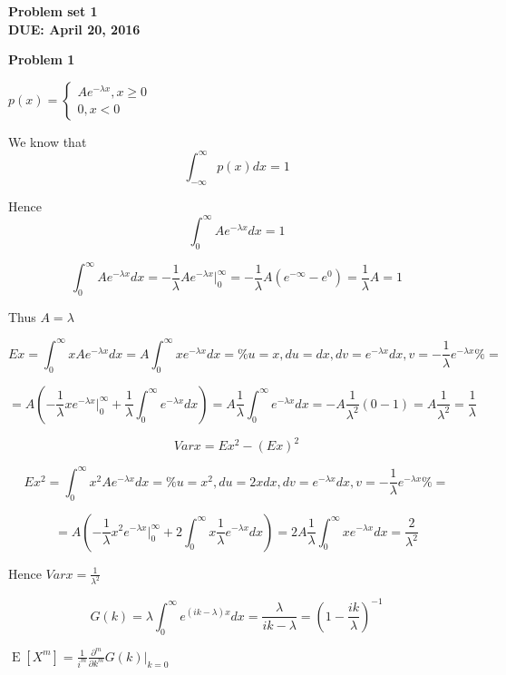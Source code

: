 \documentclass[12pt]{article}
\begin{document}
	\begin{center}
		\textbf{Problem set 1 \\
			DUE: April 20, 2016 \\}
	\end{center}
		
	\bigskip
	
	\textbf{Problem 1}		
	
	\bigskip
		
	$	p(x) = \begin{cases}
		A e^{-\lambda x}, x \geq 0\\
		0, x < 0
	\end{cases}
	$ 
	
	We know that $$ \int_{-\infty}^{\infty} p(x) dx = 1 $$
	
	Hence $$ \int_{0}^{\infty} A e^{-\lambda x} dx = 1 $$
	
	$$ \int_{0}^{\infty} A e^{-\lambda x} dx = -\frac{1}{\lambda} A e^{-\lambda x} |_{0}^{\infty} = -\frac{1}{\lambda} A (e^{-\infty} - e^0) = \frac{1}{\lambda} A = 1 $$
	
	Thus $A = \lambda$ 
	
	$$ Ex = \int_{0}^{\infty} x A e^{-\lambda x} dx = A \int_{0}^{\infty} x e^{-\lambda x} dx = \% u = x, du = dx, dv = e^{-\lambda x}dx, v = -\frac{1}{\lambda} e^{-\lambda x} \% = $$
	
	$$ = A \left( -\frac{1}{\lambda} xe^{-\lambda x} |_{0}^{\infty} + \frac{1}{\lambda} \int_{0}^{\infty} e^{-\lambda x} dx \right) = A \frac{1}{\lambda} \int_{0}^{\infty} e^{-\lambda x} dx = - A \frac{1}{\lambda^2}(0 - 1) = A \frac{1}{\lambda^2} = \frac{1}{\lambda} $$
	
	$$ Var x = Ex^2 - (Ex)^2 $$
	
	$$ Ex^2 = \int_{0}^{\infty} x^2 A e^{-\lambda x} dx = \% u = x^2, du = 2xdx, dv = e^{-\lambda x}dx, v = -\frac{1}{\lambda} e^{-\lambda x} \% = $$
	
	$$ = A \left( - \frac{1}{\lambda} x^2 e^{-\lambda x} |_{0}^{\infty} + 2 \int_{0}^{\infty} x \frac{1}{\lambda} e^{-\lambda x} dx \right) = 2A\frac{1}{\lambda} \int_{0}^{\infty} x e^{-\lambda x} dx = \frac{2}{\lambda^2} $$
	
	Hence $Varx = \frac{1}{\lambda^2}$
	
	$$ G(k) = \lambda \int_{0}^{\infty} e^{(ik - \lambda) x} dx = \frac{\lambda}{ik - \lambda} = \left(1 - \frac{ik}{\lambda} \right)^{-1} $$
	
	$ \operatorname{E}[X^m] = \frac{1}{i^m} \frac{\partial ^m}{\partial k^m} G(k) |_{k = 0} $
	
\end{document}

